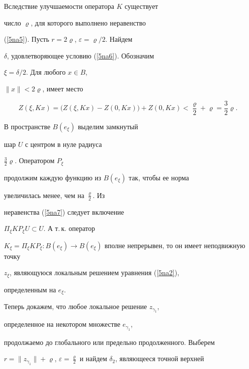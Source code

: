 \begin{pf}


Вследствие улучшаемости оператора $K$ существует


число $\varrho$, для которого выполнено неравенство


(\ref{5na5}). Пусть $r=2\varrho$, $\varepsilon={\varrho}/{2}$. Найдем


$\delta$, удовлетворяющее условию (\ref{5na6}). Обозначим


$\xi={\delta}/{2}$. Для любого $x\in B$,


$\|x\|<2 \varrho$, имеет место


\begin{equation}\label{5na7}


Z(\xi,K x)=\big(Z(\xi,K x)-Z(0, K x)\big)+Z(0, K x)<


\frac{\varrho}{2}+\varrho=\frac{3}{2}\varrho.


\end{equation}


В пространстве $B(e_\xi)$ выделим замкнутый


шар $U$ с центром в нуле радиуса


$\frac{3}{2}\varrho$. Оператором $P_{\xi}$


продолжим каждую функцию из $B(e_{\xi})$ так, чтобы ее норма


увеличилась менее, чем на $\frac{\varrho}{2}$. Из


неравенства (\ref{5na7}) следует включение


$\Pi_{\xi}K P_{\xi} U \subset U$. А т.\,к. оператор


$K_{\xi}=\Pi_{\xi} K P_{\xi} :B(e_{\xi})\to


B(e_{\xi})$ вполне непрерывен, то он имеет неподвижную точку


$z_{\xi}$, являющуюся локальным решением уравнения (\ref{5na2}),


определенным на $e_{\xi}$.





Теперь докажем, что любое локальное решение $z_{\gamma_{1}}$,


определенное на некотором множестве $e_{\gamma_{1}}$,


продолжаемо до глобального или предельно продолженного. Выберем


$r=\|z_{\gamma_{1}}\|+\varrho$, $\varepsilon=


\frac{\varrho}{2}$ и найдем $\delta_2$, являющееся точной верхней



\end{pf}
